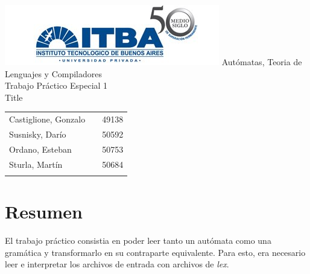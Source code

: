 \documentclass[a4paper,10pt]{article}
\begin{document}
\begin{titlepage}
	\thispagestyle{empty}
	\begin{center}
		\includegraphics[scale=0.7]{./images/itba.jpg}
		\vfill
		\Huge{Autómatas, Teoria de Lenguajes y Compiladores}\\
		\vspace{1cm}
		\huge{Trabajo Práctico Especial 1} \\
		\vspace{0.3cm}
		\huge{Title}
	\end{center}
	\vspace{2cm}
	\large{
		\begin{tabular}{lcr}
			Castiglione, Gonzalo & & 49138 \\
			Susnisky, Darío & & 50592 \\
			Ordano, Esteban & & 50753 \\
			Sturla, Martín & & 50684 \\
			\\ 
		\end{tabular}
	}
	\vfill
	\flushright{\today}
\end{titlepage}

\newpage


	\thispagestyle{empty}
\tableofcontents

\newpage

\setcounter{page}{1}

\newpage

\section{Resumen}
El trabajo práctico consistia en poder leer tanto un autómata como una gramática y transformarlo en su contraparte
 equivalente. Para esto, era necesario leer e interpretar los archivos de entrada con archivos de \textit{lex}.

\newpage
\end{document}
